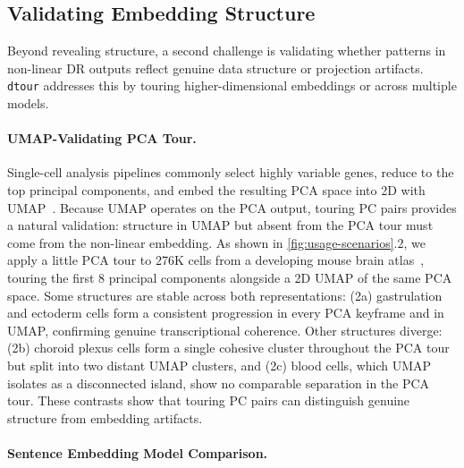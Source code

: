 \documentclass{vgtc}
\newcommand{\dtour}{\texorpdfstring{\texttt{dtour}\xspace}{dtour}}
\begin{document}
\subsection{Validating Embedding Structure}
\label{sec:validating-embedding-structure}

Beyond revealing structure, a second challenge is validating whether patterns in non-linear DR outputs reflect genuine data structure or projection artifacts. \dtour{} addresses this by touring higher-dimensional embeddings or across multiple models.

\paragraph{UMAP-Validating PCA Tour.}
\label{sec:umap-validating-pca-tour}

Single-cell analysis pipelines commonly select highly variable genes, reduce to the top principal components, and embed the resulting PCA space into 2D with UMAP~\cite{becht2019dimensionality}. Because UMAP operates on the PCA output, touring PC pairs provides a natural validation: structure in UMAP but absent from the PCA tour must come from the non-linear embedding. As shown in \autoref{fig:usage-scenarios}.2, we apply a little PCA tour to 276K cells from a developing mouse brain atlas~\cite{lamanno2021molecular}, touring the first 8 principal components alongside a 2D UMAP of the same PCA space. Some structures are stable across both representations: (2a) gastrulation and ectoderm cells form a consistent progression in every PCA keyframe and in UMAP, confirming genuine transcriptional coherence. Other structures diverge: (2b) choroid plexus cells form a single cohesive cluster throughout the PCA tour but split into two distant UMAP clusters, and (2c) blood cells, which UMAP isolates as a disconnected island, show no comparable separation in the PCA tour. These contrasts show that touring PC pairs can distinguish genuine structure from embedding artifacts.

\paragraph{Sentence Embedding Model Comparison.}
\label{sec:sentence-embedding-model-comparison}
\end{document}
